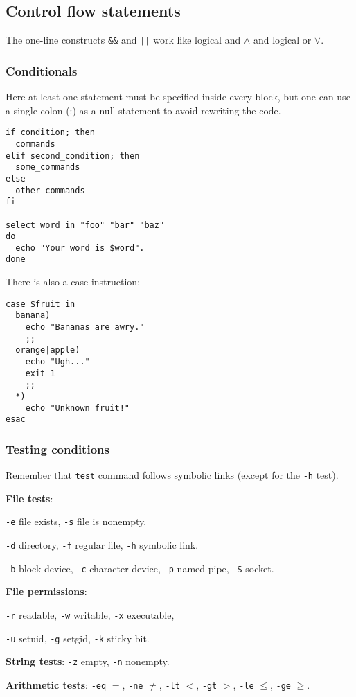 \subsection{Control flow statements}
The one-line constructs \texttt{\&\&} and \texttt{||} work like logical and $\wedge$ and logical or $\vee$.

\subsubsection{Conditionals}
Here at least one statement must be specified inside every block,
but one can use a single colon (:) as a null statement to avoid
rewriting the code.

\begin{verbatim}
if condition; then
  commands
elif second_condition; then
  some_commands
else
  other_commands	
fi

select word in "foo" "bar" "baz"
do
  echo "Your word is $word".
done
\end{verbatim}

There is also a case instruction:
\begin{verbatim}
case $fruit in
  banana)
    echo "Bananas are awry."
    ;;
  orange|apple)
    echo "Ugh..."
    exit 1
    ;;
  *)
    echo "Unknown fruit!"
esac
\end{verbatim}



\subsubsection{Testing conditions}
Remember that \texttt{test} command follows symbolic links (except for the \texttt{-h} test).
\begin{itemx} 
\item \textbf{File tests}:
\begin{enumx}
    \item \texttt{-e} file exists, 
    \texttt{-s} file is nonempty. 
    \item \texttt{-d} directory, 
    \texttt{-f} regular file, 
    \texttt{-h} symbolic link. 
    \item \texttt{-b} block device, 
    \texttt{-c} character device, 
    \texttt{-p} named pipe, 
    \texttt{-S} socket.
\end{enumx}
\item \textbf{File permissions}:
\begin{enumx}
    \item \texttt{-r} readable,
    \texttt{-w} writable,
    \texttt{-x} executable,
    \item \texttt{-u} setuid,
    \texttt{-g} setgid,
    \texttt{-k} sticky bit.
\end{enumx}
\item \textbf{String tests}: \texttt{-z} empty, \texttt{-n} nonempty.
\item \textbf{Arithmetic tests}: 
\texttt{-eq} $=$, 
\texttt{-ne} $\neq$, 
\texttt{-lt} $<$, 
\texttt{-gt} $>$, 
\texttt{-le} $\le$, 
\texttt{-ge} $\ge$.
\end{itemx}

